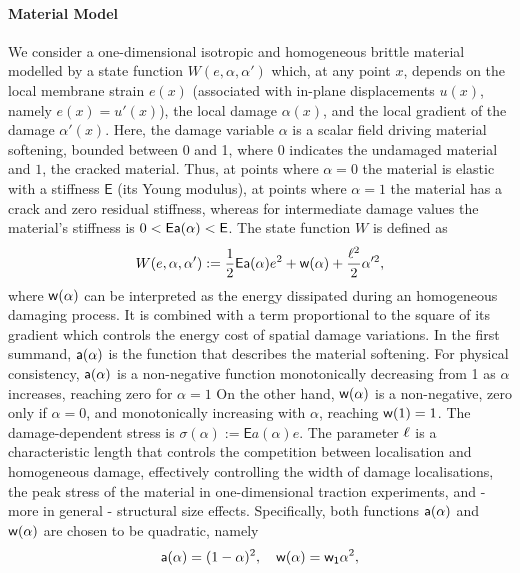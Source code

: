 \documentclass[10pt]{article}
\begin{document}
\paragraph{Material Model}
We consider a one-dimensional isotropic and homogeneous brittle material modelled by a state function $W(e, \alpha, \alpha')$ which, at any point $x$,
%
depends on the local membrane strain $e(x)$ (associated with  in-plane displacements $u(x)$, namely $e(x) = u'(x)$), the local damage $\alpha(x)$, and the local gradient of the damage $\alpha'(x)$.
Here, the damage variable $\alpha$ is a scalar field driving material softening, bounded between 0 and 1, where $0$ indicates the undamaged material and $1$, the cracked material. Thus, at points where $\alpha=0$ the material is elastic with a stiffness $\mathsf{E}$ (its Young modulus), at points where $\alpha=1$ the material has a crack and zero residual stiffness, whereas for intermediate damage values the material's stiffness is $0<\mathsf{E}\mathsf{a}(\alpha)< \mathsf{E}$.
The state function $W$ is defined as
\begin{equation}
    \label{def:energy_material}
    W(e, \alpha, \alpha'):= \frac{1}{2} \mathsf{E} \mathsf{a}(\alpha)e^2 +\mathsf{w}(\alpha) + \frac{\ell^2}{2}\alpha'^2,
\end{equation}
where $\mathsf{w}(\alpha)$ can be interpreted as the energy dissipated during an homogeneous damaging process. It is combined with a term proportional to the square of its gradient which controls the energy cost of spatial damage variations. In the first summand, $\mathsf{a}(\alpha)$ is the function that describes the material softening. %
For physical consistency, $\mathsf{a}(\alpha)$ is a non-negative function monotonically decreasing from 1 as $\alpha$ increases, reaching zero for $\alpha=1$
On the other hand, $\mathsf{w}(\alpha)$ is a non-negative, zero only if $\alpha=0$, and monotonically increasing with $\alpha$, reaching $\mathsf{w}(1)=1$.
The damage-dependent stress is $\sigma(\alpha):=\mathsf{E}a(\alpha) e$. The parameter $\ell$ is a characteristic length that controls the competition between localisation and homogeneous damage, effectively controlling the width of damage localisations, the peak stress of the material in one-dimensional traction experiments, and - more in general - structural size effects.
Specifically, both functions $\mathsf{a}(\alpha)$
%
and $\mathsf{w}(\alpha)$ are chosen to be quadratic, namely
%
\begin{equation}
    \label{def:constitutive_functions}
    \mathsf{a}(\alpha) = (1-\alpha)^2, \quad \mathsf{w}(\alpha) = \mathsf{w_1}\alpha^2,
\end{equation}
\end{document}
